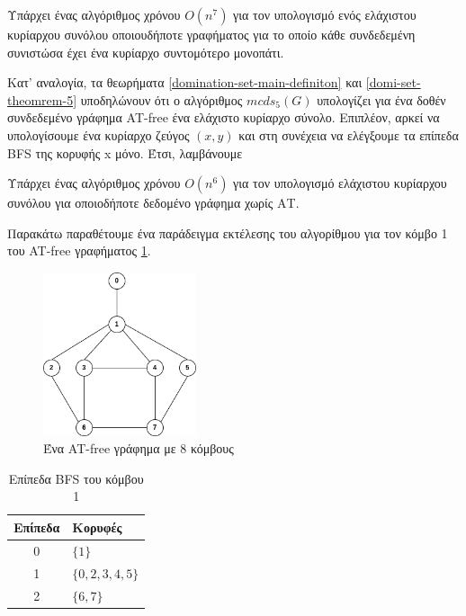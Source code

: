 \begin{theorem}
	\label{domi-set-theomrem-5}
	Υπάρχει ένας αλγόριθμος χρόνου $O(n^7)$ για τον υπολογισμό ενός ελάχιστου κυρίαρχου συνόλου οποιουδήποτε γραφήματος για το οποίο κάθε συνδεδεμένη συνιστώσα έχει ένα κυρίαρχο συντομότερο μονοπάτι.
\end{theorem}
Κατ' αναλογία, τα θεωρήματα \ref{domination-set-main-definiton} και \ref{domi-set-theomrem-5} υποδηλώνουν ότι ο αλγόριθμος $mcds_5(G)$ υπολογίζει για ένα δοθέν
συνδεδεμένο γράφημα AT-free ένα ελάχιστο κυρίαρχο σύνολο. Επιπλέον, αρκεί να υπολογίσουμε ένα κυρίαρχο ζεύγος $(x,y)$ και στη συνέχεια να ελέγξουμε τα επίπεδα BFS
της κορυφής x μόνο. Έτσι, λαμβάνουμε

\begin{theorem}
	Υπάρχει ένας αλγόριθμος χρόνου $O(n^6)$ για τον υπολογισμό ελάχιστου
	κυρίαρχου συνόλου για οποιοδήποτε δεδομένο γράφημα χωρίς ΑΤ.
\end{theorem}

Παρακάτω παραθέτουμε ένα παράδειγμα εκτέλεσης του αλγορίθμου για τον κόμβο 1 του AT-free γραφήματος \ref{fig:at-free-graph-example-domi}.

\begin{figure}[H]
	\centering
	\includegraphics[width=0.4\textwidth]{pictures/at-free-graph.png} 
	\caption{Ένα AT-free γράφημα με 8 κόμβους}
	\label{fig:at-free-graph-example-domi}
\end{figure}


\begin{table}[H]
	\centering
	\caption{Επίπεδα BFS του κόμβου 1}
	\label{tab:bfs_levels}
	\begin{tabular}{|c|l|}
		\hline
		\textbf{Επίπεδα} & \textbf{Κορυφές} \\
		\hline
		0 & $\{1\}$ \\
		1 & $\{0, 2, 3, 4, 5\}$ \\
		2 & $\{6, 7\}$ \\
		\hline
	\end{tabular}
\end{table}

